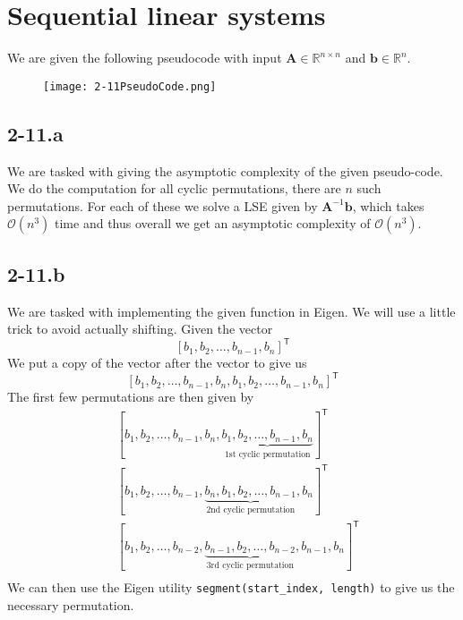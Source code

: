 \documentclass{article}
\begin{document}
\section*{Sequential linear systems}
We are given the following pseudocode with input $\mathbf{A}\in \mathbb{R}^{n \times n}$ and $\mathbf{b}\in \mathbb{R}^{n}$.
\begin{figure}[!hbt]
    \centering
\texttt{[image: 2-11PseudoCode.png]}
\end{figure}
\subsection*{2-11.a} 
We are tasked with giving the asymptotic complexity of the given pseudo-code. We do the computation for all cyclic permutations, there are $n$ such permutations. For each of these we solve a LSE given by $\mathbf{A}^{-1}\mathbf{b}$, which takes $\mathcal{O}\left(n^{3}\right)$ time and thus overall we get an asymptotic complexity of $\mathcal{O}\left(n^{3}\right)$.

\subsection*{2-11.b}
We are tasked with implementing the given function in Eigen. We will use a little trick to avoid actually shifting. Given the vector 
\begin{equation*}
    \left[b_{1}, b_{2}, \dots, b_{n-1}, b_{n}\right]^{\mathsf{T}}
\end{equation*}
We put a copy of the vector after the vector to give us
\begin{equation*}
    \left[b_{1}, b_{2}, \dots, b_{n-1}, b_{n}, b_{1}, b_{2}, \dots, b_{n-1}, b_{n}\right]^{\mathsf{T}}
\end{equation*}
The first few permutations are then given by
\begin{align*}
    &[b_{1}, b_{2}, \dots, b_{n-1}, b_{n},\underbrace{b_{1}, b_{2}, \dots, b_{n-1}, b_{n}}_{\text{$1$st cyclic permutation}}]^{\mathsf{T}} \\
    &[b_{1}, b_{2}, \dots, b_{n-1}, \underbrace{b_{n}, b_{1}, b_{2}, \dots, b_{n-1}}_{\text{$2$nd cyclic permutation}}, b_{n}]^{\mathsf{T}} \\
    &[b_{1}, b_{2}, \dots, b_{n-2}, \underbrace{b_{n-1}, b_{2}, \dots, b_{n-2}}_{\text{$3$rd cyclic permutation}}, b_{n-1}, b_{n}]^{\mathsf{T}} \\
\end{align*}
We can then use the Eigen utility \verb|segment(start_index, length)| to give us the necessary permutation. 
\end{document}
